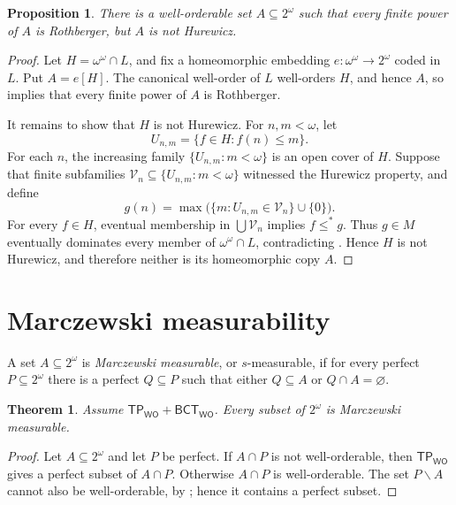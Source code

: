 \documentclass[11pt,reqno]{amsart}
\newcommand{\WO}{\mathsf{WO}}
\newcommand{\BCTWO}{\mathsf{BCT}_{\WO}}
\newcommand{\TP}{\mathsf{TP}_{\WO}}
\theoremstyle{plain}
\newtheorem{theorem}{Theorem}[section]
\newtheorem{proposition}[proposition]{Proposition}
\theoremstyle{definition}
\theoremstyle{remark}
\begin{document}
\begin{proposition}\label{prop:not-hurewicz}
There is a well-orderable set $A\subseteq2^\omega$ such that every finite power of $A$ is Rothberger, but $A$ is not Hurewicz.
\end{proposition}

\begin{proof}
Let $H=\omega^\omega\cap L$, and fix a homeomorphic embedding $e:\omega^\omega\to2^\omega$ coded in $L$.
Put $A=e[H]$.
The canonical well-order of $L$ well-orders $H$, and hence $A$, so  implies that every finite power of $A$ is Rothberger.

It remains to show that $H$ is not Hurewicz.
For $n,m<\omega$, let
\[
U_{n,m}=\{f\in H:f(n)\leq m\}.
\]
For each $n$, the increasing family $\{U_{n,m}:m<\omega\}$ is an open cover of $H$.
Suppose that finite subfamilies $\mathcal V_n\subseteq\{U_{n,m}:m<\omega\}$ witnessed the Hurewicz property, and define
\[
g(n)=\max\bigl(\{m:U_{n,m}\in\mathcal V_n\}\cup\{0\}\bigr).
\]
For every $f\in H$, eventual membership in $\bigcup\mathcal V_n$ implies $f\leq^*g$.
Thus $g\in M$ eventually dominates every member of $\omega^\omega\cap L$, contradicting .
Hence $H$ is not Hurewicz, and therefore neither is its homeomorphic copy $A$.
\end{proof}

\section{Marczewski measurability}
\label{sec:marczewski}

A set $A\subseteq2^\omega$ is \emph{Marczewski measurable}, or
$s$-measurable, if for every perfect $P\subseteq2^\omega$ there is a perfect
$Q\subseteq P$ such that either $Q\subseteq A$ or $Q\cap A=\varnothing$.

\begin{theorem}\label{thm:s-measurable}
Assume $\TP+\BCTWO$.  Every subset of $2^\omega$ is Marczewski measurable.
\end{theorem}

\begin{proof}
Let $A\subseteq2^\omega$ and let $P$ be perfect.  If $A\cap P$ is not
well-orderable, then $\TP$ gives a perfect subset of $A\cap P$.  Otherwise
$A\cap P$ is well-orderable.  The set $P\smallsetminus A$ cannot also be
well-orderable, by ; hence it contains a perfect
subset.
\end{proof}
\end{document}
